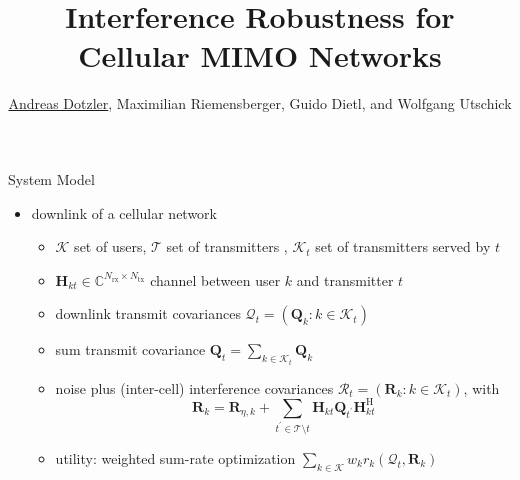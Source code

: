 \documentclass[a0,2col,print,fontscale=1.3]{msvposter}
\newcommand{\B}[1]{\boldsymbol{#1}}
\newcommand{\setof}[1]{\mathcal{#1}}
\newcommand{\Ntx}{N_{\text{tx}}}
\newcommand{\Nrx}{N_{\text{rx}}}
\DeclareMathOperator*{\He}{H}
\begin{document}
\author{\underline{Andreas Dotzler}\footnotemark[1],  Maximilian Riemensberger\footnotemark[1], Guido Dietl\footnotemark[2], and Wolfgang Utschick\footnotemark[1]}
\title{Interference Robustness for Cellular MIMO  Networks 
}
\affiliationA{[1] \MSVname - \TUMname} %


\begin{poster}

\begin{postercolumn}


\begin{posterbox}{System Model}
\begin{itemize}
 \item downlink of a cellular network
 \begin{itemize}
%     
  \item $\setof{K}$ set of users, $\setof{T}$ set of transmitters , $\setof{K}_t$ set of transmitters served by $t$
  \item $\B H_{kt} \in \mathbb{C}^{\Nrx \times \Ntx }$ channel between user $k$ and transmitter $t$
  \item downlink transmit covariances 
        $\setof{Q}_t = \left(\B Q_{k} : k \in \setof{K}_t \right)$ 
  \item sum transmit covariance $\B Q_t = \sum_{k\in\setof{K}_t} \B Q_k$
  \item noise plus (inter-cell) interference covariances
        $\setof{R}_t = \left( \B R_{k} : k \in \setof{K}_t \right)$, with
 $$\B R_k = \B R_{\eta,k} + \sum_{t^{\prime}  \in  \setof{T} \setminus t} \B H_{kt} \B Q_{t^{\prime}} \B H_{kt}^{\He}$$ 
  \item utility: weighted sum-rate optimization $\sum_{k\in\setof{K}} w_k r_k(\setof{Q}_t,\B R_k)$

\end{itemize}
\end{itemize}
\end{posterbox}
\end{postercolumn}
\end{poster}
\end{document}
